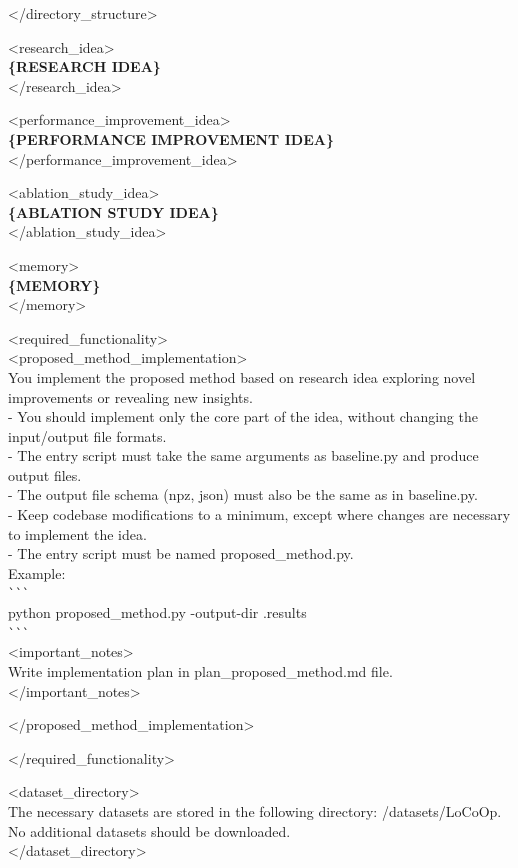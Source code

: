 \begin{tcolorbox}[colback=gray!10, colframe=gray!40!black, breakable=true, title=Prompt for Coding Agent (An Example in Stage 1)]
</directory\_structure>
\vspace{6pt}

<research\_idea>\\
\textbf{\{RESEARCH IDEA\}}\\
</research\_idea>
\vspace{6pt}

<performance\_improvement\_idea>\\
\textbf{\{PERFORMANCE IMPROVEMENT IDEA\}}\\
</performance\_improvement\_idea>
\vspace{6pt}

<ablation\_study\_idea>\\
\textbf{\{ABLATION STUDY IDEA\}}\\
</ablation\_study\_idea>
\vspace{6pt}

<memory>\\
\textbf{\{MEMORY\}}\\
</memory>
\vspace{6pt}

<required\_functionality>\\
<proposed\_method\_implementation>\\
You implement the proposed method based on research idea exploring novel improvements or revealing new insights.\\
- You should implement only the core part of the idea, without changing the input/output file formats.\\
- The entry script must take the same arguments as baseline.py and produce output files.\\
- The output file schema (npz, json) must also be the same as in baseline.py.\\
- Keep codebase modifications to a minimum, except where changes are necessary to implement the idea.\\
- The entry script must be named proposed\_method.py.\\
Example:\\
\verb|```|\\
python proposed\_method.py \text{-}-output-dir .\/results\\
\verb|```|\\
<important\_notes>\\
Write implementation plan in plan\_proposed\_method.md file.\\
</important\_notes>
\vspace{6pt}

</proposed\_method\_implementation>
\vspace{6pt}

</required\_functionality>
\vspace{6pt}

<dataset\_directory>\\
The necessary datasets are stored in the following directory: /datasets/LoCoOp.\\
No additional datasets should be downloaded.\\
</dataset\_directory>
\end{tcolorbox}
